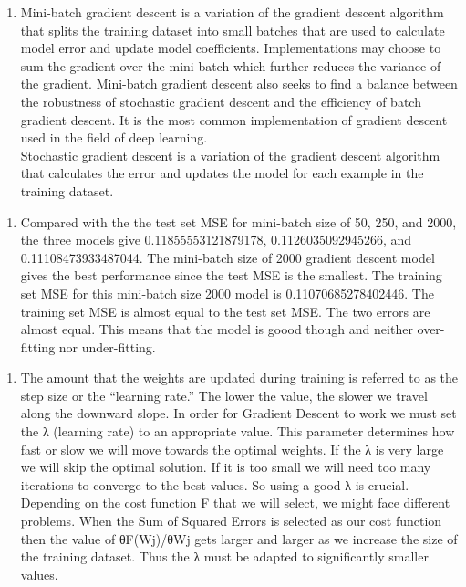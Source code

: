 \documentclass[11pt]{article}
\providecommand{\tightlist}{%
      \setlength{\itemsep}{0pt}\setlength{\parskip}{0pt}}
\begin{document}
    \begin{enumerate}
\def\labelenumi{\arabic{enumi}.}
\setcounter{enumi}{1}
\tightlist
\item
  Mini-batch gradient descent is a variation of the gradient descent
  algorithm that splits the training dataset into small batches that are
  used to calculate model error and update model coefficients.
  Implementations may choose to sum the gradient over the mini-batch
  which further reduces the variance of the gradient. Mini-batch
  gradient descent also seeks to find a balance between the robustness
  of stochastic gradient descent and the efficiency of batch gradient
  descent. It is the most common implementation of gradient descent used
  in the field of deep learning.\\
  Stochastic gradient descent is a variation of the gradient descent
  algorithm that calculates the error and updates the model for each
  example in the training dataset.
\end{enumerate}

    \begin{enumerate}
\def\labelenumi{\arabic{enumi}.}
\setcounter{enumi}{2}
\tightlist
\item
  Compared with the the test set MSE for mini-batch size of 50, 250, and
  2000, the three models give 0.11855553121879178, 0.1126035092945266,
  and 0.11108473933487044. The mini-batch size of 2000 gradient descent
  model gives the best performance since the test MSE is the smallest.
  The training set MSE for this mini-batch size 2000 model is
  0.11070685278402446. The training set MSE is almost equal to the test
  set MSE. The two errors are almost equal. This means that the model is
  goood though and neither over-fitting nor under-fitting.
\end{enumerate}

    \begin{enumerate}
\def\labelenumi{\arabic{enumi}.}
\setcounter{enumi}{3}
\tightlist
\item
  The amount that the weights are updated during training is referred to
  as the step size or the ``learning rate.'' The lower the value, the
  slower we travel along the downward slope. In order for Gradient
  Descent to work we must set the λ (learning rate) to an appropriate
  value. This parameter determines how fast or slow we will move towards
  the optimal weights. If the λ is very large we will skip the optimal
  solution. If it is too small we will need too many iterations to
  converge to the best values. So using a good λ is crucial. Depending
  on the cost function F that we will select, we might face different
  problems. When the Sum of Squared Errors is selected as our cost
  function then the value of θF(Wj)/θWj gets larger and larger as we
  increase the size of the training dataset. Thus the λ must be adapted
  to significantly smaller values.
\end{enumerate}
\end{document}
